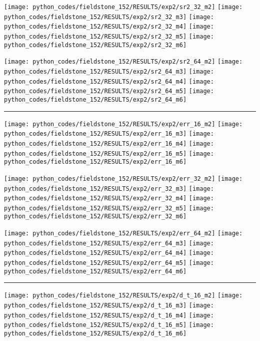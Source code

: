 \noindent
\texttt{[image: python\_codes/fieldstone\_152/RESULTS/exp2/sr2\_32\_m2]}
\texttt{[image: python\_codes/fieldstone\_152/RESULTS/exp2/sr2\_32\_m3]}
\texttt{[image: python\_codes/fieldstone\_152/RESULTS/exp2/sr2\_32\_m4]}
\texttt{[image: python\_codes/fieldstone\_152/RESULTS/exp2/sr2\_32\_m5]}
\texttt{[image: python\_codes/fieldstone\_152/RESULTS/exp2/sr2\_32\_m6]}

\noindent
\texttt{[image: python\_codes/fieldstone\_152/RESULTS/exp2/sr2\_64\_m2]}
\texttt{[image: python\_codes/fieldstone\_152/RESULTS/exp2/sr2\_64\_m3]}
\texttt{[image: python\_codes/fieldstone\_152/RESULTS/exp2/sr2\_64\_m4]}
\texttt{[image: python\_codes/fieldstone\_152/RESULTS/exp2/sr2\_64\_m5]}
\texttt{[image: python\_codes/fieldstone\_152/RESULTS/exp2/sr2\_64\_m6]}

\hrule

\noindent
\texttt{[image: python\_codes/fieldstone\_152/RESULTS/exp2/err\_16\_m2]}
\texttt{[image: python\_codes/fieldstone\_152/RESULTS/exp2/err\_16\_m3]}
\texttt{[image: python\_codes/fieldstone\_152/RESULTS/exp2/err\_16\_m4]}
\texttt{[image: python\_codes/fieldstone\_152/RESULTS/exp2/err\_16\_m5]}
\texttt{[image: python\_codes/fieldstone\_152/RESULTS/exp2/err\_16\_m6]}

\noindent
\texttt{[image: python\_codes/fieldstone\_152/RESULTS/exp2/err\_32\_m2]}
\texttt{[image: python\_codes/fieldstone\_152/RESULTS/exp2/err\_32\_m3]}
\texttt{[image: python\_codes/fieldstone\_152/RESULTS/exp2/err\_32\_m4]}
\texttt{[image: python\_codes/fieldstone\_152/RESULTS/exp2/err\_32\_m5]}
\texttt{[image: python\_codes/fieldstone\_152/RESULTS/exp2/err\_32\_m6]}

\noindent
\texttt{[image: python\_codes/fieldstone\_152/RESULTS/exp2/err\_64\_m2]}
\texttt{[image: python\_codes/fieldstone\_152/RESULTS/exp2/err\_64\_m3]}
\texttt{[image: python\_codes/fieldstone\_152/RESULTS/exp2/err\_64\_m4]}
\texttt{[image: python\_codes/fieldstone\_152/RESULTS/exp2/err\_64\_m5]}
\texttt{[image: python\_codes/fieldstone\_152/RESULTS/exp2/err\_64\_m6]}

\hrule

\noindent
\texttt{[image: python\_codes/fieldstone\_152/RESULTS/exp2/d\_t\_16\_m2]}
\texttt{[image: python\_codes/fieldstone\_152/RESULTS/exp2/d\_t\_16\_m3]}
\texttt{[image: python\_codes/fieldstone\_152/RESULTS/exp2/d\_t\_16\_m4]}
\texttt{[image: python\_codes/fieldstone\_152/RESULTS/exp2/d\_t\_16\_m5]}
\texttt{[image: python\_codes/fieldstone\_152/RESULTS/exp2/d\_t\_16\_m6]}

